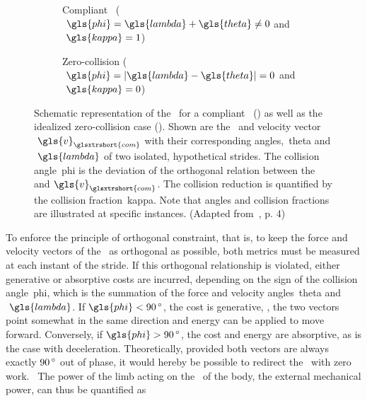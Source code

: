         \begin{figure}[H]%
            \centering%
            \begin{subfigure}{0.5\linewidth}%
                \centering%
                
                \caption{Compliant~ (\ie$~\gls{phi} = \gls{lambda} + \gls{theta} \neq 0$ and$~\gls{kappa} = 1$)}
                \label{fig:compliant-slip}
            \end{subfigure}%
            \hfil%
            \begin{subfigure}{0.5\linewidth}%
                \centering%
                
                \caption{Zero-collision (\ie$~\gls{phi} = \lvert\gls{lambda} - \gls{theta}\rvert = 0$ and$~\gls{kappa} = 0$)}
                \label{fig:zero-collision}
            \end{subfigure}%
            \caption{Schematic representation of the~ for a compliant~ () as well as the idealized zero-collision case (). Shown are the~ and velocity vector$~\gls{v}_{\glsxtrshort{com}}$ with their corresponding angles,~\gls{theta} and$~\gls{lambda}$ of two isolated, hypothetical strides. The collision angle~\gls{phi} is the deviation of the orthogonal relation between the~ and$~\gls{v}_{\glsxtrshort{com}}$. The collision reduction is quantified by the
            collision fraction~\gls{kappa}. Note that angles and collision fractions are illustrated at specific instances. (Adapted from~\cite{Lee2011}, p. 4)}%
            \label{fig:mca}%
        \end{figure}%
        
        To enforce the principle of orthogonal constraint, that is, to keep the force and velocity vectors of the~ as orthogonal as possible, both metrics must be measured at each instant of the stride. If this orthogonal relationship is violated, either generative or absorptive costs are incurred, depending on the sign of the collision angle~\gls{phi}, which is the summation of the force and velocity angles~\gls{theta} and$~\gls{lambda}$. If$~\gls{phi} < 90\,\textrm{\si{\degree}}$, the cost is generative, \ie, the two vectors point somewhat in the same direction and energy can be applied to move forward. Conversely, if$~\gls{phi} > 90\,\textrm{\si{\degree}}$, the cost and energy are absorptive, as is the case with deceleration. Theoretically, provided both vectors are always exactly $90\,\textrm{\si{\degree}}$ out of phase, it would hereby be possible to redirect the~ with zero work.~\cite{Lee2018} The power of the limb acting on the~ of the body, \ie the external mechanical power, can thus be quantified as %
        
